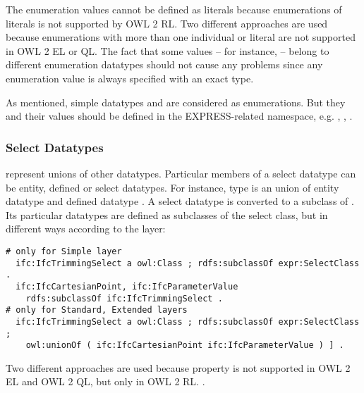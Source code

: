 The enumeration values cannot be defined as literals because enumerations of literals is not supported by OWL 2 RL. Two different approaches are used because enumerations with more than one individual or literal are not supported in OWL 2 EL or QL. The fact that some values -- for instance,  -- belong to different enumeration data\-types should not cause any problems since any enumeration value is always specified with an exact type. 

As mentioned, simple data\-types  and  are considered as enumerations. But they and their values should be defined in the EXPRESS-related namespace, e.g. , , .



\subsubsection{Select Datatypes} represent unions of other data\-types. Particular members of a select data\-type can be entity, defined or select data\-types. For instance, type  is an union of entity data\-type  and defined data\-type . A select data\-type is converted to a subclass of . Its particular data\-types are defined as subclasses of the select class, but in different ways according to the layer:

\begin{lstlisting}
# only for Simple layer
  ifc:IfcTrimmingSelect a owl:Class ; rdfs:subclassOf expr:SelectClass .
  ifc:IfcCartesianPoint, ifc:IfcParameterValue
    rdfs:subclassOf ifc:IfcTrimmingSelect .
# only for Standard, Extended layers
  ifc:IfcTrimmingSelect a owl:Class ; rdfs:subclassOf expr:SelectClass ;
    owl:unionOf ( ifc:IfcCartesianPoint ifc:IfcParameterValue ) ] .
\end{lstlisting}

Two different approaches are used because property  is not supported in OWL 2 EL and OWL 2 QL, but only in OWL 2 RL. \cite{motik2012owl}.





